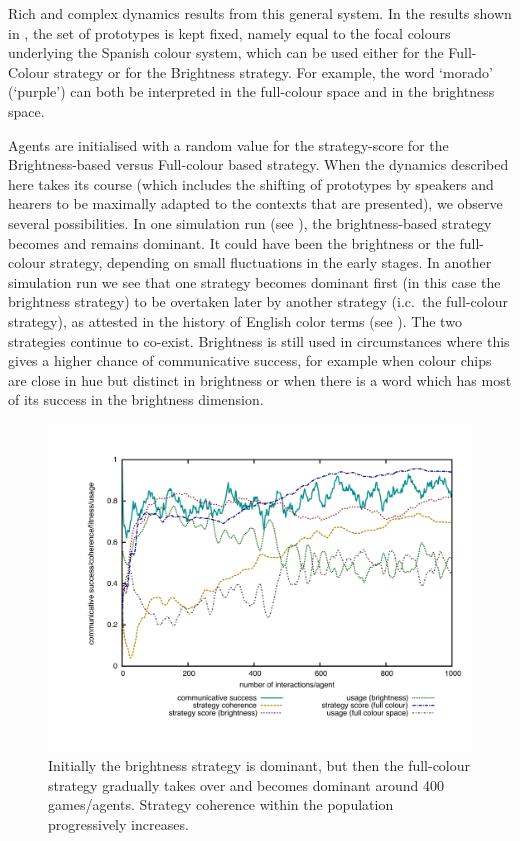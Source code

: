 Rich and complex dynamics results from this general system. In the results shown in , the 
set of prototypes is kept fixed, namely equal to the focal colours underlying 
the Spanish colour system, which can be used either for the Full-Colour strategy or for the Brightness strategy. 
For example, the word `morado' (`purple') can both be interpreted in the full-colour space and in the brightness space. 

Agents are initialised with a random value for the strategy-score for the Brightness-based versus
Full-colour based strategy. When the dynamics described here takes its 
course (which includes the shifting of prototypes by speakers and hearers to be maximally adapted to the 
contexts that are presented), we observe several possibilities. In one simulation run (see ), 
the brightness-based strategy becomes and remains dominant. It could have been the brightness 
or the full-colour strategy, depending on small fluctuations in the early stages. 
In another simulation run we see that one strategy becomes dominant first (in this case the brightness strategy) 
to be overtaken later by another strategy (i.c.\ the full-colour strategy), 
as attested in the history of English color terms (see ). 
The two strategies continue to co-exist. Brightness is still used in 
circumstances where this gives a higher chance of communicative success, for example when colour chips are 
close in hue but distinct in brightness or when there is a word which has most of its success in the brightness 
dimension. 


\begin{figure}[thb!]
\centerline{\includegraphics[width=\textwidth]{chap12/figs/strategies-competition.pdf}}
\caption{{Initially the brightness strategy is dominant, but then the full-colour 
strategy gradually takes over and becomes dominant around 400 games/agents. Strategy coherence within the population
progressively increases.}
\label{fig:strategies-dynamics}}
\end{figure}

